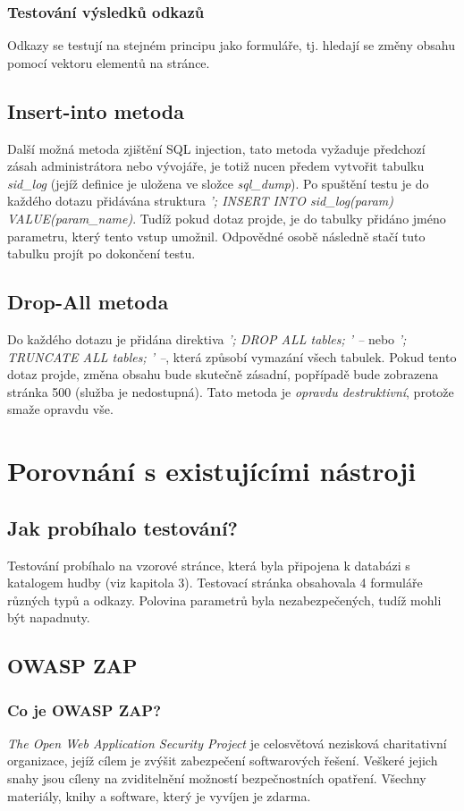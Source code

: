 \documentclass[12pt, a4paper]{report}
\begin{document}
\subsection{Testování výsledků odkazů}
Odkazy se testují na stejném principu jako formuláře, tj. hledají se změny obsahu pomocí vektoru elementů na stránce.

\section{Insert-into metoda}
Další možná metoda zjištění SQL injection, tato metoda vyžaduje předchozí zásah administrátora nebo vývojáře, je totiž nucen předem vytvořit tabulku \textit{sid\_log} (jejíž definice je uložena ve složce \textit{sql\_dump}). Po spuštění testu je do každého dotazu přidávána struktura \textit{'; INSERT INTO sid\_log(param) VALUE(param\_name)}. Tudíž pokud dotaz projde, je do tabulky přidáno jméno parametru, který tento vstup umožnil. Odpovědné osobě následně stačí tuto tabulku projít po dokončení testu.

\section{Drop-All metoda}
Do každého dotazu je přidána direktiva \textit{'; DROP ALL tables; ' --} nebo \textit{'; TRUNCATE ALL tables; ' --}, která způsobí vymazání všech tabulek. Pokud tento dotaz projde, změna obsahu bude skutečně zásadní, popřípadě bude zobrazena stránka 500 (služba je nedostupná). Tato metoda je \textit{opravdu destruktivní}, protože smaže opravdu vše.


\chapter{Porovnání s existujícími nástroji}

\section{Jak probíhalo testování?}
Testování probíhalo na vzorové stránce, která byla připojena k databázi s katalogem hudby (viz kapitola 3). Testovací stránka obsahovala 4 formuláře různých typů a odkazy. Polovina parametrů byla nezabezpečených, tudíž mohli být napadnuty.

\section{OWASP ZAP}
\subsection{Co je OWASP ZAP?}
\textit{The Open Web Application Security Project} je celosvětová nezisková charitativní organizace\cite{owasp}, jejíž cílem je zvýšit zabezpečení softwarových řešení. Veškeré jejich snahy jsou cíleny na zviditelnění možností bezpečnostních opatření. Všechny materiály, knihy a software, který je vyvíjen je zdarma. 
\end{document}
